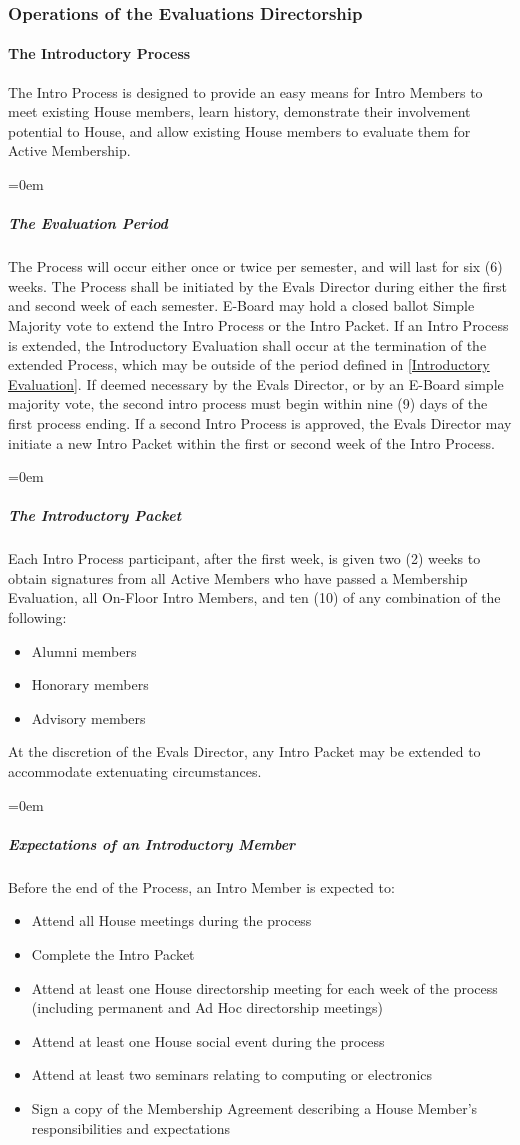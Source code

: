 \documentclass{article}
\newcommand{\asubsection}[1]{\subsubsection{#1} \label{#1}}
\newcommand{\asubsubsection}[1]{\paragraph{#1} \label{#1}}
\newcommand{\asubsubsubsection}[1]{\parindent=0em\subparagraph{#1} \label{#1}}
\begin{document}
\asubsection{Operations of the Evaluations Directorship}

\asubsubsection{The Introductory Process}
The Intro Process is designed to provide an easy means for Intro Members to meet existing House members, learn history, demonstrate their involvement potential to House, and allow existing House members to evaluate them for Active Membership.

\asubsubsubsection{The Evaluation Period}
The Process will occur either once or twice per semester, and will last for six (6) weeks.
The Process shall be initiated by the Evals Director during either the first and second week of each semester.
E-Board may hold a closed ballot Simple Majority vote to extend the Intro Process or the Intro Packet.
If an Intro Process is extended, the Introductory Evaluation shall occur at the termination of the extended Process, which may be outside of the period defined in \ref{Introductory Evaluation}.
If deemed necessary by the Evals Director, or by an E-Board simple majority vote, the second intro process must begin within nine (9) days of the first process ending.
If a second Intro Process is approved, the Evals Director may initiate a new Intro Packet within the first or second week of the Intro Process.

\asubsubsubsection{The Introductory Packet}

Each Intro Process participant, after the first week, is given two (2) weeks to obtain signatures from all Active Members who have passed a Membership Evaluation, all On-Floor Intro Members, and ten (10) of any combination of the following:
\begin{itemize}
	\item Alumni members
	\item Honorary members
	\item Advisory members
\end{itemize}
At the discretion of the Evals Director, any Intro Packet may be extended to accommodate extenuating circumstances.

\asubsubsubsection{Expectations of an Introductory Member}
Before the end of the Process, an Intro Member is expected to:
\begin{itemize}
\item Attend all House meetings during the process
\item Complete the Intro Packet
\item Attend at least one House directorship meeting for each week of the process (including permanent and Ad Hoc directorship meetings)
\item Attend at least one House social event during the process
\item Attend at least two seminars relating to computing or electronics
\item Sign a copy of the Membership Agreement describing a House Member’s responsibilities and expectations
\end{itemize}
\end{document}
